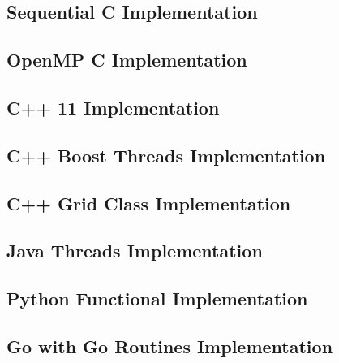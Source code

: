 \documentclass[11pt]{article} %
\begin{document}
\subsection{Sequential C Implementation}

\pagebreak
\subsection{OpenMP C Implementation}

\pagebreak
\subsection{C++ 11 Implementation}

\pagebreak
\subsection{C++ Boost Threads Implementation}

\pagebreak
\subsection{C++ Grid Class Implementation}

\pagebreak
\subsection{Java Threads Implementation}

\pagebreak
\subsection{Python Functional Implementation}

\pagebreak
\subsection{Go with Go Routines Implementation}

\pagebreak
\end{document}
